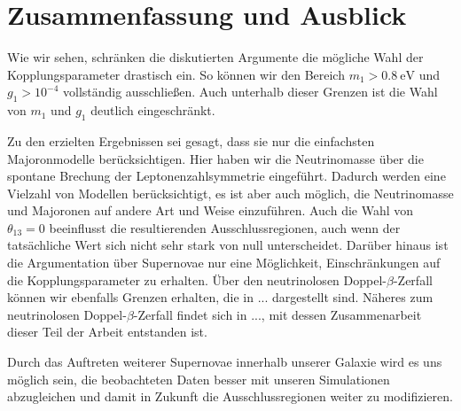 \chapter{Zusammenfassung und Ausblick}

Wie wir sehen, schränken die diskutierten Argumente die mögliche Wahl der Kopplungsparameter drastisch ein.
So können wir den Bereich $m_1 > \SI{0.8}{\eV}$ und $g_1 > 10^{-4}$ vollständig ausschließen.
Auch unterhalb dieser Grenzen ist die Wahl von $m_1$ und $g_1$ deutlich eingeschränkt.

Zu den erzielten Ergebnissen sei gesagt, dass sie nur die einfachsten Majoronmodelle berücksichtigen.
Hier haben wir die Neutrinomasse über die spontane Brechung der Leptonenzahlsymmetrie eingeführt.
Dadurch werden eine Vielzahl von Modellen berücksichtigt, es ist aber auch möglich, die Neutrinomasse und Majoronen auf andere Art und Weise einzuführen.
Auch die Wahl von $\theta_{1 3} = 0$ beeinflusst die resultierenden Ausschlussregionen, auch wenn der tatsächliche Wert sich nicht sehr stark von null unterscheidet.
Darüber hinaus ist die Argumentation über Supernovae nur eine Möglichkeit, Einschränkungen auf die Kopplungsparameter zu erhalten.
Über den neutrinolosen Doppel-$\beta$-Zerfall können wir ebenfalls Grenzen erhalten, die in ... dargestellt sind. %
Näheres zum neutrinolosen Doppel-$\beta$-Zerfall findet sich in ..., mit dessen Zusammenarbeit dieser Teil der Arbeit entstanden ist. %

Durch das Auftreten weiterer Supernovae innerhalb unserer Galaxie wird es uns möglich sein, die beobachteten Daten besser mit unseren Simulationen abzugleichen und damit in Zukunft die Ausschlussregionen weiter zu modifizieren.



